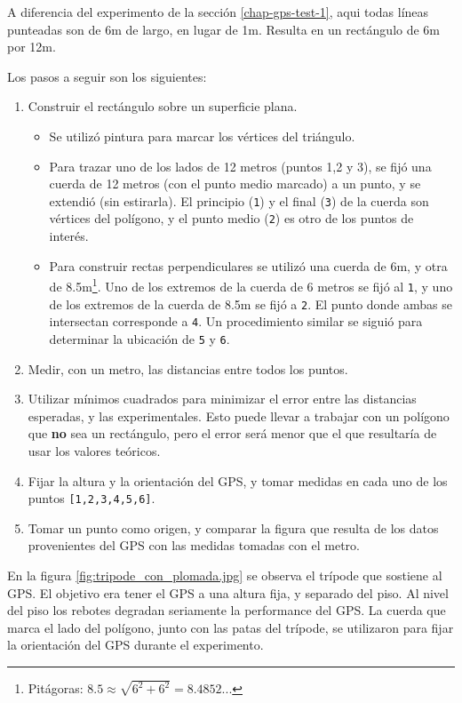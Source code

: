\documentclass[spanish,12pt,a4paper,titlepage]{report}
\begin{document}
A diferencia del experimento de la sección \ref{chap-gps-test-1}, aqui todas líneas punteadas son de 6m de largo, en lugar de 1m. Resulta en un rectángulo de 6m por 12m.

Los pasos a seguir son los siguientes:

\begin{enumerate}
\item Construir el rectángulo sobre un superficie plana.
  \begin{itemize}
  \item Se utilizó pintura para marcar los vértices del triángulo.
  \item Para trazar uno de los lados de 12 metros (puntos 1,2 y 3), se fijó una cuerda de 12 metros (con el punto medio marcado) a un punto, y se extendió (sin estirarla). El principio (\verb+1+) y el final (\verb+3+) de la cuerda son vértices del polígono, y el punto medio (\verb+2+) es otro de los puntos de interés.
  \item Para construir rectas perpendiculares se utilizó una cuerda de 6m, y otra de 8.5m\footnote{Pitágoras: $8.5 \approx \sqrt{6^2 + 6^2} = 8.4852...$}. Uno de los extremos de la cuerda de 6 metros se fijó al \verb+1+, y uno de los extremos de la cuerda de 8.5m se fijó a \verb+2+. El punto donde ambas se intersectan corresponde a \verb+4+. Un procedimiento similar se siguió para determinar la ubicación de \verb+5+ y \verb+6+.
  \end{itemize}
\item Medir, con un metro, las distancias entre todos los puntos.
\item Utilizar mínimos cuadrados para minimizar el error entre las distancias esperadas, y las experimentales. Esto puede llevar a trabajar con un polígono que \textbf{no} sea un rectángulo, pero el error será menor que el que resultaría de usar los valores teóricos.
\item Fijar la altura y la orientación del GPS, y tomar medidas en cada uno de los puntos \verb+[1,2,3,4,5,6]+.
\item Tomar un punto como origen, y comparar la figura que resulta de los datos provenientes del GPS con las medidas tomadas con el metro.
\end{enumerate}

En la figura \ref{fig:tripode_con_plomada.jpg} se observa el trípode que sostiene al GPS. El objetivo era tener el GPS a una altura fija, y separado del piso. Al nivel del piso los rebotes degradan seriamente la performance del GPS. La cuerda que marca el lado del polígono, junto con las patas del trípode, se utilizaron para fijar la orientación del GPS durante el experimento.
\end{document}
